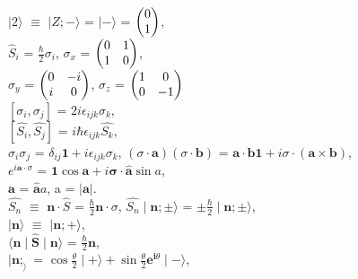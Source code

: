 \documentclass[a4paper, 10pt, onepage]{elegantbook}
\begin{document}
{$\mid 2 \rangle$ $\equiv$ $\mid Z; - \rangle$ = $\mid - \rangle$ = $\begin{pmatrix}0\cr1\cr\end{pmatrix}$, \\ 

$\hat{S}_i$ = $\frac{\hbar}{2} \sigma_i$, $\sigma_x$ = $\begin{pmatrix}0 & 1\cr 1 & 0\cr\end{pmatrix}$, \\

$\sigma_y$ = $\begin{pmatrix}0 & -i\cr i & 0\cr\end{pmatrix}$, $\sigma_z$ = $\begin{pmatrix}1 & 0\cr 0 & -1\cr\end{pmatrix}$  \\

$[\sigma_i, \sigma_j]$ = $2i \epsilon_{ijk} \sigma_k$,  \\ 

$[\hat{S_i}, \hat{S_j}]$ = $i \hbar \epsilon_{ijk} \hat{S_k}$,  \\  

$\sigma_i \sigma_j$ = $\delta_{ij} \mathbf{1} + i \epsilon_{ijk} \sigma_k$, $(\sigma \cdot \mathbf{a} ) (\sigma \cdot \mathbf{b} )$ = $\mathbf{a} \cdot \mathbf{b} \mathbf{1} + i \sigma \cdot (\mathbf{a} \times \mathbf{b})$, \\

$e^{i \mathbf a \cdot \sigma}$ = $\mathbf{1} \cos \mathbf a + i {\mathbf \sigma}  \cdot  \hat{\mathbf a} \sin a$,  \\

$ \mathbf a$ = $\hat{\mathbf a} a$, a = $|\mathbf a|$.  \\  

$\hat{S_n}$ $\equiv$ $\mathbf n \cdot \hat{S}$ = $\frac{\hbar}{2} \mathbf n \cdot \sigma$, $\hat{S_n} \mid \mathbf n; \pm \rangle$ =  $\pm \frac{\hbar}{2} \mid \mathbf n; \pm \rangle$, \\ 

$\mid \mathbf n \rangle$ $\equiv$ $\mid \mathbf n ; + \rangle$,  \\

 $\langle \mathbf n \mid  \hat{\mathbf S} \mid \mathbf n \rangle$ = $\frac{\hbar}{2} \mathbf n$,  \\

$\mid \mathbf n; _ \rangle$ = $\cos \frac{\theta}{2} \mid + \rangle + \sin \frac{\theta}{2} \mathbf{e}^{\mathbf{i} \theta} \mid - \rangle$, \\

}
\end{document}
